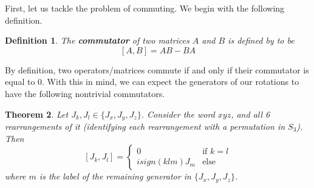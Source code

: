 \documentclass[10pt]{ucthesis}
\newtheorem{definition}{Definition}[chapter]
\newtheorem{theorem}[definition]{Theorem}
\begin{document}
First, let us tackle the problem of commuting. We begin with the following definition.

\begin{definition}
	The \textbf{commutator} of two matrices $A$ and $B$ is defined by to be 
$$[A,B]=AB-BA$$
\end{definition}

By definition, two operators/matrices commute if and only if their commutator is equal to $0$. With this in mind, we can expect the generators of our rotations to have the following nontrivial commutators.

\begin{theorem}
	Let $J_k,J_l \in \{J_x,J_y,J_z\}$. Consider the word $xyz$, and all 6 rearrangements of it (identifying each rearrangement with a permutation in $S_3$). Then 
$$[J_k , J_l] = \begin{cases}
					0 & \text{if }k = l \\
					isign(klm)J_m& \text{else}
					\end{cases}$$
where $m$ is the label of the remaining generator in $\{J_x,J_y,J_z\}$.
\end{theorem}
\end{document}
